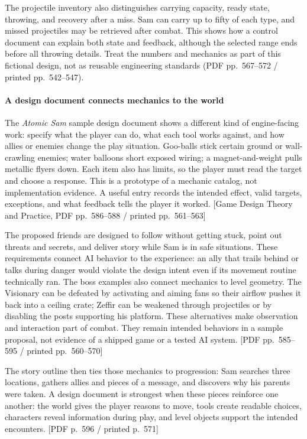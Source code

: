 The projectile inventory also distinguishes carrying capacity, ready state, throwing, and recovery after a miss. Sam can carry up to fifty of each type, and missed projectiles may be retrieved after combat. This shows how a control document can explain both state and feedback, although the selected range ends before all throwing details. Treat the numbers and mechanics as part of this fictional design, not as reusable engineering standards (PDF pp.~567--572 / printed pp.~542--547).

\paragraph{A design document connects mechanics to the world}\label{05-engine-i-ch009-a-design-document-connects-mechanics-to-the-world}

\hypertarget{05-engine-i-ch009-a-design-document-connects-mechanics-to-the-world}{}

The \emph{Atomic Sam} sample design document shows a different kind of engine-facing work: specify what the player can do, what each tool works against, and how allies or enemies change the play situation. Goo-balls stick certain ground or wall-crawling enemies; water balloons short exposed wiring; a magnet-and-weight pulls metallic flyers down. Each item also has limits, so the player must read the target and choose a response. This is a prototype of a mechanic catalog, not implementation evidence. A useful entry records the intended effect, valid targets, exceptions, and what feedback tells the player it worked. {[}Game Design Theory and Practice, PDF pp.~586--588 / printed pp.~561--563{]}

The proposed friends are designed to follow without getting stuck, point out threats and secrets, and deliver story while Sam is in safe situations. These requirements connect AI behavior to the experience: an ally that trails behind or talks during danger would violate the design intent even if its movement routine technically ran. The boss examples also connect mechanics to level geometry. The Visionary can be defeated by activating and aiming fans so their airflow pushes it back into a ceiling crate; Zeffir can be weakened through projectiles or by disabling the posts supporting his platform. These alternatives make observation and interaction part of combat. They remain intended behaviors in a sample proposal, not evidence of a shipped game or a tested AI system. {[}PDF pp.~585--595 / printed pp.~560--570{]}

The story outline then ties those mechanics to progression: Sam searches three locations, gathers allies and pieces of a message, and discovers why his parents were taken. A design document is strongest when these pieces reinforce one another: the world gives the player reasons to move, tools create readable choices, characters reveal information during play, and level objects support the intended encounters. {[}PDF p.~596 / printed p.~571{]}

